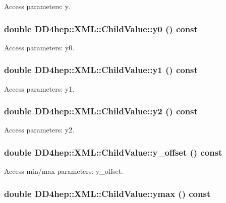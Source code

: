 Access parameters: y. \hypertarget{struct_d_d4hep_1_1_x_m_l_1_1_child_value_aa013bcfa03ef8e7c2ac5f3b99e6736dc}{
\subsubsection[{y0}]{\setlength{\rightskip}{0pt plus 5cm}double DD4hep::XML::ChildValue::y0 () const}}
\label{struct_d_d4hep_1_1_x_m_l_1_1_child_value_aa013bcfa03ef8e7c2ac5f3b99e6736dc}


Access parameters: y0. \hypertarget{struct_d_d4hep_1_1_x_m_l_1_1_child_value_ada9ae76054068818c3711b1d7d0e772f}{
\subsubsection[{y1}]{\setlength{\rightskip}{0pt plus 5cm}double DD4hep::XML::ChildValue::y1 () const}}
\label{struct_d_d4hep_1_1_x_m_l_1_1_child_value_ada9ae76054068818c3711b1d7d0e772f}


Access parameters: y1. \hypertarget{struct_d_d4hep_1_1_x_m_l_1_1_child_value_a2d090567352d8987d4c4f5ac8f468c3b}{
\subsubsection[{y2}]{\setlength{\rightskip}{0pt plus 5cm}double DD4hep::XML::ChildValue::y2 () const}}
\label{struct_d_d4hep_1_1_x_m_l_1_1_child_value_a2d090567352d8987d4c4f5ac8f468c3b}


Access parameters: y2. \hypertarget{struct_d_d4hep_1_1_x_m_l_1_1_child_value_aa7b943238e215a0958a1143084814f04}{
\subsubsection[{y\_\-offset}]{\setlength{\rightskip}{0pt plus 5cm}double DD4hep::XML::ChildValue::y\_\-offset () const}}
\label{struct_d_d4hep_1_1_x_m_l_1_1_child_value_aa7b943238e215a0958a1143084814f04}


Access min/max parameters: y\_\-offset. \hypertarget{struct_d_d4hep_1_1_x_m_l_1_1_child_value_aa9eb71920308de7244f59772a2d3c8f4}{
\subsubsection[{ymax}]{\setlength{\rightskip}{0pt plus 5cm}double DD4hep::XML::ChildValue::ymax () const}}
\label{struct_d_d4hep_1_1_x_m_l_1_1_child_value_aa9eb71920308de7244f59772a2d3c8f4}


